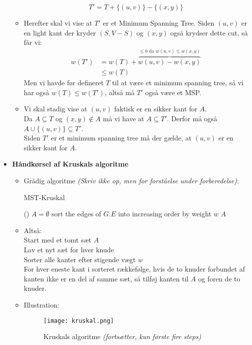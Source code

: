 \begin{itemize}
\begin{itemize}
 	$$
 	T' = T + \{(u, v)\} - \{(x, y)\}
 	$$
 	\item Herefter skal vi vise at $T'$ er et Minimum Spanning Tree. Siden $(u, v)$ er en light kant der kryder $(S, V-S)$ og $(x, y)$ også krydser dette cut, så får vi:
 	\begin{align*}
 	w(T') &= w(T) + \overbrace{w(u, v) - w(x, y)}^{\text{$\leq 0$ da $w(u, v) \leq w(x, y)$}}\\
 	      &\leq w(T)
 	\end{align*}
 	Men vi havde før defineret $T$ til at være et minimum spanning tree, så vi har også $w(T) \leq w(T')$, altså må $T'$ også være et MSP.
 	\item Vi skal stadig vise at $(u, v)$ faktisk er en sikker kant for $A$.\\
 	Da $A \subseteq T$ og $(x, y) \notin A$ må vi have at $A \subseteq T'$. Derfor må også $A \cup \{(u, v)\} \subseteq T'$.\\
 	Siden $T'$ er et minimum spanning tree må der gælde, at $(u, v)$ er en sikker kant for $A$.
\end{itemize}


\newpage
\item \textbf{Håndkørsel af Kruskals algoritme}
\begin{itemize}
	\item Grådig algoritme \textit{(Skriv ikke op, men for forståelse under forberedelse)}:\\
	\begin{algorithm}[H] \caption{MST-Kruskal} \label{alg:kruskal}
		\Fn(){}{
			$A = \emptyset$\;
			sort the edges of $G.E$ into increasing order by weight $w$\;
			\Return $A$\;
		}
	\end{algorithm}\vspace{1em}
	
	
	\item Altså:\\
	Start med et tomt sæt $A$\\
	Lav et nyt sæt for hver knude\\
	Sorter alle kanter efter stigende vægt $w$\\
	For hver eneste kant i sorteret rækkefølge, hvis de to knuder forbundet af kanten ikke er en del af samme sæt, så tilføj kanten til $A$ og foren de to knuder.
	\item Illustration:
	\begin{figure}[H]
		\begin{center}
			\texttt{[image: kruskal.png]}
		\end{center}
		\caption{Kruskals algoritme \textit{(fortsætter, kun første fire steps)}}
		\label{fig:kruskal}
	\end{figure}
	

\end{itemize}
\end{itemize}
